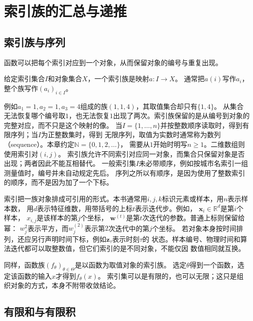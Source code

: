 \section{索引族的汇总与递推}
\label{sec:prelim-indices-sums-recurrences}

\subsection{索引族与序列}
\label{sec:prelim-indexed-sequences}

函数可以把每个索引对应到一个对象，从而保留对象的编号与重复出现。
\begin{definition}[索引族]
\label{def:prelim-indexed-family}
给定索引集合$I$和对象集合$X$，一个索引族是映射$a:I\to X$。
通常把$a(i)$写作$a_i$，整个族写作$(a_i)_{i\in I}$。
\end{definition}
例如$a_1=1,a_2=1,a_3=4$组成的族$(1,1,4)$，其取值集合却只有$\{1,4\}$。
从集合无法恢复哪个编号取$1$，也无法恢复$1$出现了两次。索引族保留的是从编号到对象的
完整对应，而不只是这个映射的像。
当$I=\{1,\ldots,n\}$并按整数顺序读取时，得到有限序列；当$I$为正整数集时，得到
无限序列，取值为实数时通常称为数列（sequence）。本章约定$\mathbb{N}=\{0,1,2,\ldots\}$，
需要从$1$开始时明写$n\geq1$。二维数组则使用索引对$(i,j)$。
索引族允许不同索引对应同一对象，而集合只保留对象是否出现；两者因此不能互相替代。
一般索引集$I$未必带顺序，例如按城市名索引一组测量值时，编号并未自动规定先后。
序列之所以有顺序，是因为使用了整数索引的顺序，而不是因为加了一个下标。

索引把一族对象排成可引用的形式。本书通常用$i,j,k$标识元素或样本，用$n$表示样本数，
用$d$表示特征维数，用带括号的上标$t$表示迭代步。例如，
$\bm{x}_i\in\mathbb{R}^d$是第$i$个样本，
$x_{i,j}$是该样本的第$j$个坐标，
$\bm{w}^{(t)}$是第$t$次迭代的参数。普通上标则保留给幂：
$w_j^2$表示平方，而$w_j^{(2)}$表示第$2$次迭代中的第$j$个坐标。
若对象本身按时间排列，还应另行声明时间下标，例如$\bm{z}_{\tau}$表示时刻$\tau$的
状态。样本编号、物理时间和算法迭代都可以取整数值，但它们索引的是不同对象，不能仅因
数值相同就互换。

同样，函数族$(f_\theta)_{\theta\in\Theta}$是以函数为取值对象的索引族。
选定$\theta$得到一个函数，选定该函数的输入$x$才得到$f_\theta(x)$。
索引集可以是有限的，也可以无限；这只是组织对象的方式，本身不附带收敛结论。

\subsection{有限和与有限积}
\label{sec:prelim-finite-sums-products}

